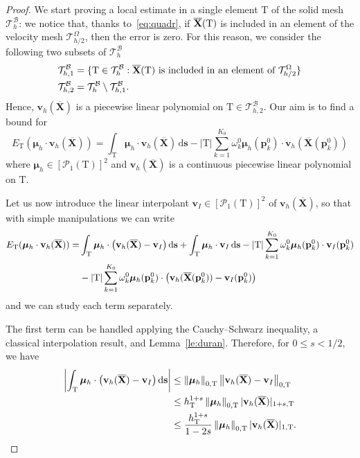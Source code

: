 \documentclass[oneside]{amsart} %
\newcommand{\norm}[1]{\left\lVert#1\right\rVert}
\newcommand{\abs}[1]{\left\lvert#1\right\rvert}
\newcommand\B{\mathcal B} %
\renewcommand\v{\mathbf{v}} %
\newcommand\s{\mathbf{s}} %
\newcommand\X{\mathbf{X}} %
\newcommand\Xbar{\overline{\X}} %
\newcommand\mmu{{\boldsymbol\mu}} %
\newcommand\ds{\mathrm{d}\s} %
\newcommand\T{\mathcal{T}} %
\newcommand\quadnode{\mathbf{p}}
\newcommand\quadweigth{\omega}
\newcommand\Pcal{\mathcal{P}}
\newcommand\tri{\mathrm{T}} %
\newcommand\DB{\begin{color}{black}}
\newcommand\BD{\end{color}}
\begin{document}
	\begin{proof}
		We start proving a local estimate in a single element $\tri$ of the solid mesh
		$\T_h^\B$: we notice that, thanks to~\eqref{eq:quadr}, if
		$\DB\Xbar(\tri)\BD$ is included in
		an element of the velocity mesh $\T_{h/2}^\Omega$, then the error is zero. For this reason, we consider the
		following two subsets of $\T_h^\B$
		\begin{equation}\label{eq:solid_mesh_partition}
			\begin{aligned}
				&\T_{h,1}^\B = \{\tri\in\T_h^\B:\DB\Xbar(\tri)\BD\text{ is included in an element of }
				\T_{h/2}^\Omega\}
				\\
				&\T_{h,2}^\B = \T_h^\B \setminus \T_{h,1}^\B.
			\end{aligned}
		\end{equation}
		Hence, $\v_h(\Xbar)$ is a piecewise linear
		polynomial on $\tri\in\T_{h,2}^\B$. 
		Our aim is to find a bound for
		\begin{equation}
			E_\tri(\mmu_h\cdot\v_h(\Xbar)) = \int_\tri \mmu_h\cdot\v_h(\Xbar)\,\ds 
			- \abs{\tri}\sum_{k=1}^{K_0}\quadweigth_k^0\mmu_h(\quadnode_k^0)\cdot\v_h(\Xbar(\quadnode_k^0))
		\end{equation}
		where $\mmu_h\in[\Pcal_1(\tri)]^2$ and $\v_h(\Xbar)$ is a continuous piecewise linear
		polynomial on $\tri$.
		
		Let us now introduce the linear interpolant $\v_I\in[\Pcal_1(\tri)]^2$ of
		$\v_h(\Xbar)$, so that with simple manipulations we can write
		\begin{equation}\label{eq:manipulation_l2}
			\begin{aligned}
				E_\tri(\mmu_h\cdot\v_h(\Xbar)) = 
				&\int_\tri \mmu_h\cdot\big(\v_h(\Xbar)-\v_I\big)\,\ds
				+ \int_\tri \mmu_h\cdot\v_I\,\ds 
				- \abs{\tri}\sum_{k=1}^{K_0}\quadweigth_k^0\mmu_h(\quadnode_k^0)
				\cdot\v_I(\quadnode_k^0)\\
				&\DB-\BD  \abs{\tri} \sum_{k=1}^{K_0}\quadweigth_k^0 \mmu_h(\quadnode_k^0)
				\cdot \big(\v_h(\Xbar(\quadnode_k^0))-\v_I(\quadnode_k^0)\big)
			\end{aligned}
		\end{equation}
		and we can study each term separately.
		
		The first term can be handled applying the Cauchy--Schwarz inequality,
		a classical interpolation result, and Lemma~\ref{le:duran}. Therefore, for $0\le s<1/2$,  we have
		\begin{equation}
			\label{eq:1st_term_l2}
			\aligned
			\abs{\int_\tri \mmu_h\cdot\big(\v_h(\Xbar)-\v_I\big)\,\ds}
			&\le \norm{\mmu_h}_{0,\tri}\norm{\v_h(\Xbar)-\v_I}_{0,\tri}\\
			&\le h_\tri^{1+s} \norm{\mmu_h}_{0,\tri} |\v_h(\Xbar)|_{1+s,\tri}\\
			&\le \frac{h_\tri^{1+s}}{1-2s}\norm{\mmu_h}_{0,\tri} |\v_h(\Xbar)|_{1,\tri}.
			\endaligned
		\end{equation}
		

\end{proof}
\end{document}
